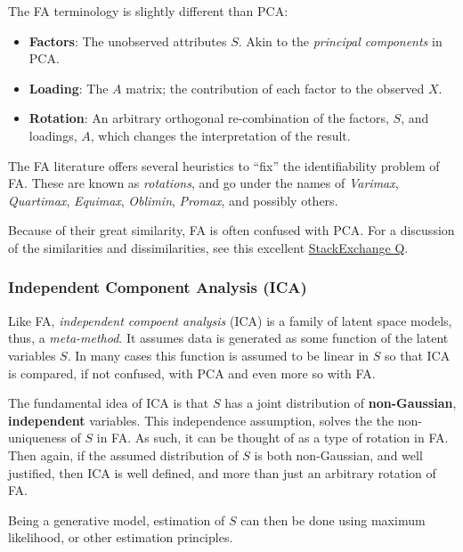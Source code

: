 \documentclass[]{book}
\theoremstyle{definition}
\theoremstyle{definition}
\theoremstyle{definition}
\theoremstyle{remark}
\begin{document}
The FA terminology is slightly different than PCA:

\begin{itemize}
\item
  \textbf{Factors}: The unobserved attributes \(S\). Akin to the
  \emph{principal components} in PCA.
\item
  \textbf{Loading}: The \(A\) matrix; the contribution of each factor to
  the observed \(X\).
\item
  \textbf{Rotation}: An arbitrary orthogonal re-combination of the
  factors, \(S\), and loadings, \(A\), which changes the interpretation
  of the result.
\end{itemize}

The FA literature offers several heuristics to ``fix'' the
identifiability problem of FA. These are known as \emph{rotations}, and
go under the names of \emph{Varimax}, \emph{Quartimax}, \emph{Equimax},
\emph{Oblimin}, \emph{Promax}, and possibly others.

Because of their great similarity, FA is often confused with PCA. For a
discussion of the similarities and dissimilarities, see this excellent
\href{https://stats.stackexchange.com/questions/123063/is-there-any-good-reason-to-use-pca-instead-of-efa-also-can-pca-be-a-substitut}{StackExchange
Q}.

\subsubsection{Independent Component Analysis
(ICA)}\label{independent-component-analysis-ica}

Like FA, \emph{independent compoent analysis} (ICA) is a family of
latent space models, thus, a \emph{meta-method}. It assumes data is
generated as some function of the latent variables \(S\). In many cases
this function is assumed to be linear in \(S\) so that ICA is compared,
if not confused, with PCA and even more so with FA.

The fundamental idea of ICA is that \(S\) has a joint distribution of
\textbf{non-Gaussian}, \textbf{independent} variables. This independence
assumption, solves the the non-uniqueness of \(S\) in FA. As such, it
can be thought of as a type of rotation in FA. Then again, if the
assumed distribution of \(S\) is both non-Gaussian, and well justified,
then ICA is well defined, and more than just an arbitrary rotation of
FA.

Being a generative model, estimation of \(S\) can then be done using
maximum likelihood, or other estimation principles.
\end{document}
